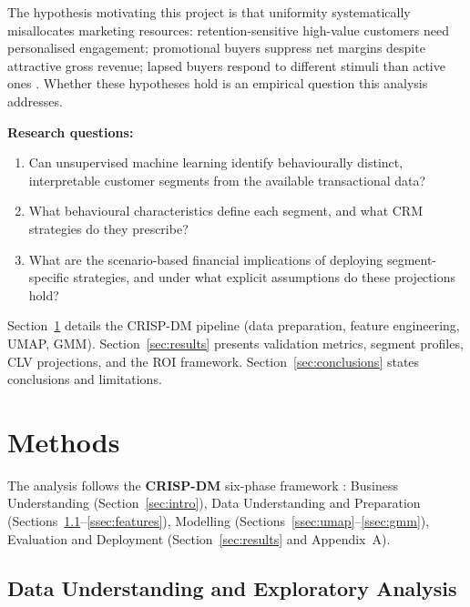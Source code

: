\documentclass[10pt,a4paper]{article}
\begin{document}
The hypothesis motivating this project is that uniformity systematically misallocates
marketing resources: retention-sensitive high-value customers need personalised
engagement; promotional buyers suppress net margins despite attractive gross revenue;
lapsed buyers respond to different stimuli than active ones \cite{gupta2006modeling}.
Whether these hypotheses hold is an empirical question this analysis addresses.

\textbf{Research questions:}
\begin{enumerate}[topsep=2pt,itemsep=0pt]
  \item[\textbf{RQ1.}] Can unsupervised machine learning identify behaviourally distinct,
    interpretable customer segments from the available transactional data?
  \item[\textbf{RQ2.}] What behavioural characteristics define each segment, and what
    CRM strategies do they prescribe?
  \item[\textbf{RQ3.}] What are the scenario-based financial implications of deploying
    segment-specific strategies, and under what explicit assumptions do these projections hold?
\end{enumerate}

Section~\ref{sec:methods} details the CRISP-DM pipeline (data preparation, feature
engineering, UMAP, GMM). Section~\ref{sec:results} presents validation metrics, segment
profiles, CLV projections, and the ROI framework. Section~\ref{sec:conclusions} states
conclusions and limitations.

\section{Methods}
\label{sec:methods}

The analysis follows the \textbf{CRISP-DM} six-phase framework \cite{chapman2000crispdm}:
Business Understanding
(Section~\ref{sec:intro}), Data Understanding and Preparation
(Sections~\ref{ssec:data}--\ref{ssec:features}), Modelling
(Sections~\ref{ssec:umap}--\ref{ssec:gmm}), Evaluation and Deployment
(Section~\ref{sec:results} and Appendix~A).

\subsection{Data Understanding and Exploratory Analysis}
\label{ssec:data}
\end{document}

